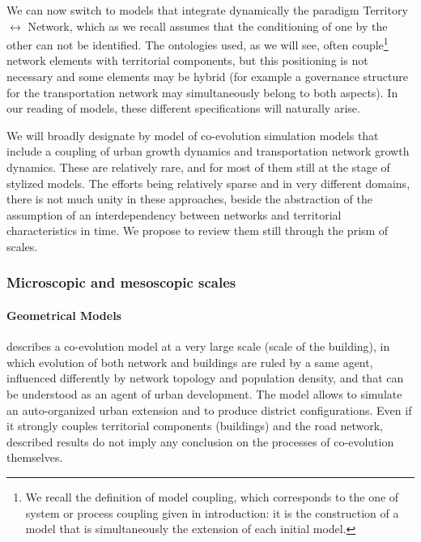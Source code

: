 We can now switch to models that integrate dynamically the paradigm Territory $\leftrightarrow$ Network, which as we recall assumes that the conditioning of one by the other can not be identified. The ontologies used, as we will see, often couple\footnote{We recall the definition of model coupling, which corresponds to the one of system or process coupling given in introduction: it is the construction of a model that is simultaneously the extension of each initial model.} network elements with territorial components, but this positioning is not necessary and some elements may be hybrid (for example a governance structure for the transportation network may simultaneously belong to both aspects). In our reading of models, these different specifications will naturally arise.

We will broadly designate by model of co-evolution simulation models that include a coupling of urban growth dynamics and transportation network growth dynamics. These are relatively rare, and for most of them still at the stage of stylized models. The efforts being relatively sparse and in very different domains, there is not much unity in these approaches, beside the abstraction of the assumption of an interdependency between networks and territorial characteristics in time. We propose to review them still through the prism of scales.

\subsubsection{Microscopic and mesoscopic scales}


\paragraph{Geometrical Models}

\cite{achibet2014model} describes a co-evolution model at a very large scale (scale of the building), in which evolution of both network and buildings are ruled by a same agent, influenced differently by network topology and population density, and that can be understood as an agent of urban development. The model allows to simulate an auto-organized urban extension and to produce district configurations. Even if it strongly couples territorial components (buildings) and the road network, described results do not imply any conclusion on the processes of co-evolution themselves.

